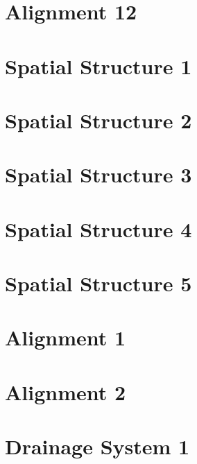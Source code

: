 \documentclass{scrartcl}
\begin{document}
\section{Alignment 12}
\label{sec:align_12}
\clearpage



\section{Spatial Structure 1}
\label{sec:spatial_1}
\clearpage

\section{Spatial Structure 2}
\label{sec:spatial_2}
\clearpage

\section{Spatial Structure 3}
\label{sec:spatial_3}
\clearpage

\section{Spatial Structure 4}
\label{sec:spatial_4}
\clearpage

\section{Spatial Structure 5}
\label{sec:spatial_5}
\clearpage


\section{Alignment 1}
\label{sec:alignment_12d_1}
\clearpage

\section{Alignment 2}
\label{sec:alignment_12d_2}
\clearpage



\section{Drainage System 1}
\label{sec:drainage_1}
\clearpage
\end{document}
